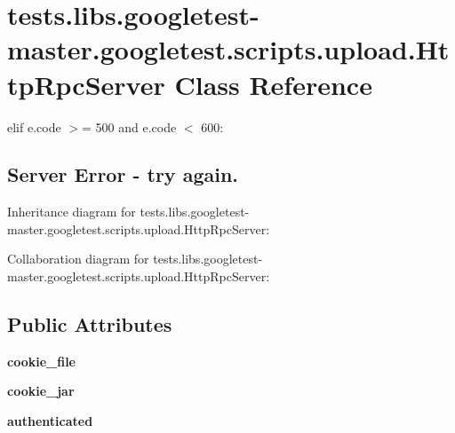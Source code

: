 \hypertarget{classtests_1_1libs_1_1googletest-master_1_1googletest_1_1scripts_1_1upload_1_1HttpRpcServer}{}\section{tests.\+libs.\+googletest-\/master.googletest.\+scripts.\+upload.\+Http\+Rpc\+Server Class Reference}
\label{classtests_1_1libs_1_1googletest-master_1_1googletest_1_1scripts_1_1upload_1_1HttpRpcServer}


elif e.\+code $>$= 500 and e.\+code $<$ 600\+: \subsection*{Server Error -\/ try again.} 




Inheritance diagram for tests.\+libs.\+googletest-\/master.googletest.\+scripts.\+upload.\+Http\+Rpc\+Server\+:


Collaboration diagram for tests.\+libs.\+googletest-\/master.googletest.\+scripts.\+upload.\+Http\+Rpc\+Server\+:
\subsection*{Public Attributes}
\begin{DoxyCompactItemize}
\item 
\mbox{\label{classtests_1_1libs_1_1googletest-master_1_1googletest_1_1scripts_1_1upload_1_1HttpRpcServer_a84389c657b1798fa7eb150ed2c9eb07e}} 
{\bfseries cookie\+\_\+file}
\item 
\mbox{\label{classtests_1_1libs_1_1googletest-master_1_1googletest_1_1scripts_1_1upload_1_1HttpRpcServer_abc720cd784d4635958958d145c106146}} 
{\bfseries cookie\+\_\+jar}
\item 
\mbox{\label{classtests_1_1libs_1_1googletest-master_1_1googletest_1_1scripts_1_1upload_1_1HttpRpcServer_aeff66d17ad3957b54d765966b827378a}} 
{\bfseries authenticated}
\end{DoxyCompactItemize}
